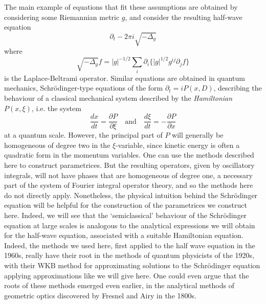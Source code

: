 \documentclass{article}
\theoremstyle{plain}
\theoremstyle{remark}
\theoremstyle{definition}
\begin{document}
The main example of equations that fit these assumptions are obtained by considering some Riemannian metric $g$, and consider the resulting half-wave equation
%
\[ \partial_t - 2 \pi i \sqrt{-\Delta_g} \]
%
where
%
\[ \sqrt{-\Delta_g} f = |g|^{-1/2} \sum_i \partial_i \{ |g|^{1/2} g^{ij} \partial_j f \} \]
%
is the Laplace-Beltrami operator. Similar equations are obtained in quantum mechanics, Schr\"{o}dinger-type equations of the form $\partial_t = i P(x,D)$, describing the behaviour of a classical mechanical system described by the \emph{Hamiltonian} $P(x,\xi)$, i.e. the system
%
\[ \frac{dx}{dt} = \frac{\partial P}{\partial \xi} \quad\text{and}\quad \frac{d\xi}{dt} = - \frac{\partial P}{\partial x} \]
%
at a quantum scale. However, the principal part of $P$ will generally be homogeneous of degree two in the $\xi$-variable, since kinetic energy is often a quadratic form in the momentum variables. One can use the methods described here to construct parametrices. But the resulting operators, given by oscillatory integrals, will not have phases that are homogeneous of degree one, a necessary part of the system of Fourier integral operator theory, and so the methods here do not directly apply. Nonetheless, the physical intuition behind the Schr\"{o}dinger equation will be helpful for the construction of the parametrices we construct here. Indeed, we will see that the `semiclassical' behaviour of the Schr\"{o}dinger equation at large scales is analogous to the analytical expressions we will obtain for the half-wave equation, associated with a suitable Hamiltonian equation. Indeed, the methods we used here, first applied to the half wave equation in the 1960s, really have their root in the methods of quantum physicists of the 1920s, with their WKB method for approximating solutions to the Schr\"{o}dinger equation applying approximations like we will give here. One could even argue that the roots of these methods emerged even earlier, in the analytical methods of geometric optics discovered by Fresnel and Airy in the 1800s.


\end{document}
